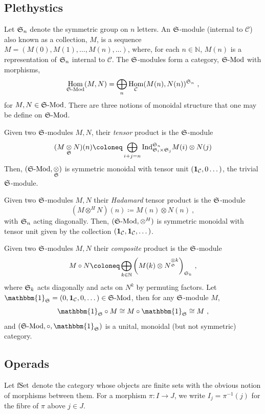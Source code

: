 \documentclass[11pt]{amsart}
\numberwithin{equation}{section}
\theoremstyle{definition}
\newcommand{\mc}{\mathcal}
\newcommand{\mf}{\mathfrak}
\DeclareMathOperator{\Hom}{Hom}
\newcommand{\Mod}{{\textup{-Mod}}}
\newcommand{\Ind}{{\textup{Ind}}}
\newcommand{\fset}{{\textup{fSet}}}
\newcommand{\Ss}{{{\mf{S}}}}
\newcommand{\CC}{{\textup{CC}}}
\newcommand{\0}{{\textbf{0}}}
\newcommand{\id}{{\textup{id}}}
\def\IN{\mathbb{N}}
\def\CC{{\mc C}}
\def \mf{\mathfrak}
\def \id{\mathbbm{1}}
\newcommand{\tensor}[1]{\underset{#1}{\otimes}}
\begin{document}
\subsection{Plethystics}

Let $\frak S_n$ denote the symmetric group on $n$ letters. An $\frak S$-module (internal to $\CC$) also known as a collection, $M$, is a sequence $M=(M(0),M(1),\dots,M(n),\dots)$, where, for each $n\in\IN$, $M(n)$ is a representation of $\frak S_n$ internal to $\CC$. The $\frak S$-modules form a category, $\frak S\Mod$ with morphisms,  
\[
\Hom_{\Ss\Mod}(M,N) = \bigoplus_n \Hom_\CC(M(n),N(n))^{\Ss_n}~,
\]
for $M,N\in \Ss\Mod$. There are three notions of monoidal structure that one may be define on $\Ss\Mod$.

Given two $\frak S$-modules $M,N$, their \emph{tensor} product is the $\frak S$-module
\[
(M\tensor{\frak S} N)(n) \coloneq \bigoplus_{i+j=n}\Ind_{\frak S_i \times \frak S_j}^{\frak S_n} M(i)\otimes N(j)
\]
Then, $(\frak S\Mod, \tensor{\frak S})$ is symmetric monoidal with tensor unit $({\bf 1}_\CC,0\dots)$, the trivial $\frak S$-module.

Given two $\frak S$-modules $M,N$ their \emph{Hadamard} tensor product is the $\frak S$-module
\[
(M\otimes^H N)(n) \coloneqq M(n)\otimes N(n)~,
\]
with $\frak S_n$ acting diagonally. Then, $(\frak S\Mod, \otimes^H)$ is symmetric monoidal with tensor unit given by the collection $(\bf 1_\CC,1_\CC,\dots)$.

Given two $\frak S$-modules $M,N$ their \emph{composite} product is the $\frak S$-module
\[
M\circ N \coloneq \bigoplus_{k\in\IN} \bigg(M(k)\otimes N^{\tensor{\Ss} k}\bigg)_{\frak S_k}~,
\]
where $\frak S_k$ acts diagonally and acts on $N^k$ by permuting factors. Let $\id_\Ss = (0,{\bf 1}_\CC,0,\dots)\in \Ss\Mod$, then for any $\frak S$-module $M$,
\[
\id_{\frak S}\circ M \cong M\circ \id_\Ss\cong M~,
\]
and $(\frak S\Mod,\circ, \id_{\frak S})$ is a unital, monoidal (but not symmetric) category.


\subsection{Operads}\label{Opsec}

Let $\fset$ denote the category whose objects are finite sets with the obvious notion of morphisms between them. For a morphism $\pi:I\rightarrow J$, we write $I_j=\pi^{-1}(j)$ for the fibre of $\pi$ above $j\in J$.
\end{document}
